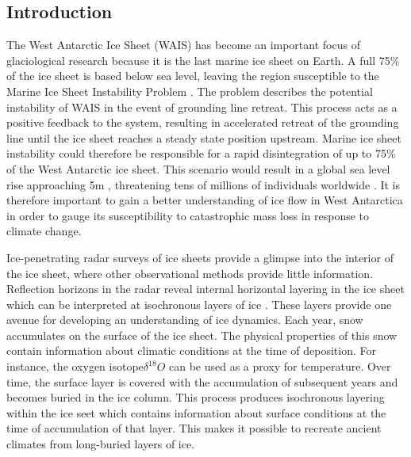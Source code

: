 \documentclass[draft,jgrga]{agutex}
\begin{document}
\begin{article}
\section{Introduction}

The West Antarctic Ice Sheet (WAIS) has become an important focus of glaciological research because it is the last marine ice sheet on Earth. A full 75$\%$ of the ice sheet is based below sea level, leaving the region susceptible to the Marine Ice Sheet Instability Problem \citep{joughin&alley2011}. The problem describes the potential instability of WAIS in the event of grounding line retreat. This process acts as a positive feedback to the system, resulting in accelerated retreat of the grounding line until the ice sheet reaches a steady state position upstream. Marine ice sheet instability could therefore be responsible for a rapid disintegration of up to 75$\%$ of the West Antarctic ice sheet. This scenario would result in a global sea level rise approaching 5m \citep{joughin&alley2011}, threatening tens of millions of individuals worldwide \citep{mcgranahan2007}. It is therefore important to gain a better understanding of ice flow in West Antarctica in order to gauge its susceptibility to catastrophic mass loss in response to climate change.  

Ice-penetrating radar surveys of ice sheets provide a glimpse into the interior of the ice sheet, where other observational methods provide little information. Reflection horizons in the radar reveal internal horizontal layering in the ice sheet which can be interpreted at isochronous layers of ice \citet{eisen2004}.  These layers provide one avenue for developing an understanding of ice dynamics.  Each year, snow accumulates on the surface of the ice sheet. The physical properties of this snow contain information about climatic conditions at the time of deposition. For instance, the oxygen isotope$\delta^{18}O$ can be used as a proxy for temperature. Over time, the surface layer is covered with the accumulation of subsequent years and becomes buried in the ice column. This process produces isochronous layering within the ice seet which contains information about surface conditions at the time of accumulation of that layer. This makes it possible to recreate ancient climates from long-buried layers of ice.
 


\end{article}
\end{document}
